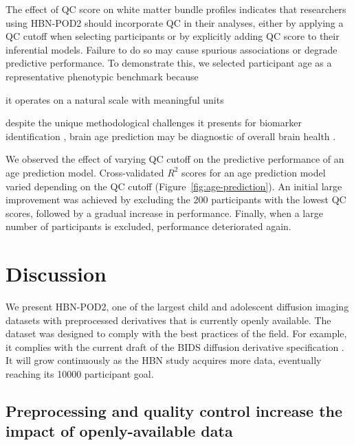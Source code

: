 \documentclass[9pt,lineno]{elife}
\begin{document}
The effect of QC score on white matter bundle profiles indicates that researchers
using HBN-POD2 should incorporate QC in their analyses, either by applying a QC cutoff
when selecting participants or by explicitly adding QC score to their inferential
models. Failure to do so may cause spurious associations or degrade predictive
performance. To demonstrate this, we selected participant age as a representative phenotypic benchmark because
\begin{enumerate*}[%
    label=(\roman*),%
    before=\unskip{ },%
    itemjoin={{, }},%
    itemjoin*={{ and }}]
    \item it operates on a natural scale with meaningful units
    \item despite the unique methodological challenges it presents for biomarker identification \citep{nelson2020biomarkers}, brain age prediction may be diagnostic of overall brain health \citep{franke2010estimating, cole2019brain, richie-halford2021multidimensional}.
\end{enumerate*}
We observed the effect of varying QC cutoff on the predictive performance of an age
prediction model. Cross-validated $R^2$ scores for an age prediction model
varied depending on the QC cutoff (Figure~\ref{fig:age-prediction}). An initial large improvement was achieved by excluding the 200 participants with the lowest QC scores, followed by a gradual increase in performance. Finally, when a large number of participants is excluded, performance deteriorated again.

\section{Discussion}

We present HBN-POD2, one of the largest child and adolescent diffusion imaging
datasets with preprocessed derivatives that is currently openly available. The dataset
was designed to comply with the best practices of the field. For example, it
complies with the current draft of the BIDS diffusion derivative specification
\citep{Pestilli2021}. It will grow continuously as the HBN study acquires more
data, eventually reaching its \num{10000} participant goal. 

\subsection{Preprocessing and quality control increase the impact of openly-available data}
\end{document}
